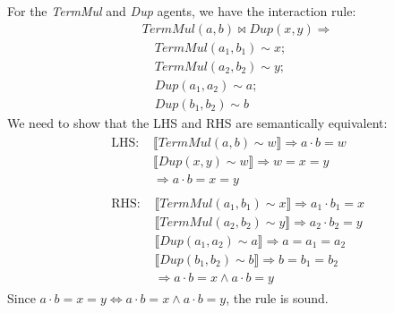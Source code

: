\begin{lemma}
	For the \textit{TermMul} and \textit{Dup} agents, we have the interaction rule:
	$$
	\begin{aligned}
		& \mathit{TermMul}(a, b) \bowtie \mathit{Dup}(x, y) \Rightarrow \\
		& \quad \mathit{TermMul}(a_1, b_1) \sim x; \\
		& \quad \mathit{TermMul}(a_2, b_2) \sim y; \\
		& \quad \mathit{Dup}(a_1, a_2) \sim a; \\
		& \quad \mathit{Dup}(b_1, b_2) \sim b
	\end{aligned}
	$$
	We need to show that the LHS and RHS are semantically equivalent:
	$$
	\begin{aligned}
		& \begin{aligned}
			\text{LHS: } & \llbracket \mathit{TermMul}(a, b) \sim w \rrbracket \Rightarrow a \cdot b = w \\
			& \llbracket \mathit{Dup}(x, y) \sim w \rrbracket \Rightarrow w = x = y \\
			& \Rightarrow a \cdot b = x = y
		\end{aligned} \\
		& \begin{aligned}
			\text{RHS: } & \llbracket \mathit{TermMul}(a_1, b_1) \sim x \rrbracket \Rightarrow a_1 \cdot b_1 = x \\
			& \llbracket \mathit{TermMul}(a_2, b_2) \sim y \rrbracket \Rightarrow a_2 \cdot b_2 = y \\
			& \llbracket \mathit{Dup}(a_1, a_2) \sim a \rrbracket \Rightarrow a = a_1 = a_2 \\
			& \llbracket \mathit{Dup}(b_1, b_2) \sim b \rrbracket \Rightarrow b = b_1 = b_2 \\
			& \Rightarrow a \cdot b = x \land a \cdot b = y
		\end{aligned}
	\end{aligned}
	$$
	Since $a \cdot b = x = y \iff a \cdot b = x \land a \cdot b = y$, the rule is sound.
\end{lemma}

